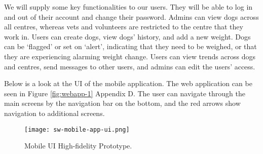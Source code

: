 We will supply some key functionalities to our users. They will be able to log in and out of their account and change their password. Admins can view dogs across all centres, whereas vets and volunteers are restricted to the centre that they work in. Users can create dogs, view dogs’ history, and add a new weight. Dogs can be ‘flagged’ or set on ‘alert’, indicating that they need to be weighed, or that they are experiencing alarming weight change. Users can view trends across dogs and centres, send messages to other users, and admins can edit the users’ access. 

Below is a look at the UI of the mobile application. The web application can be seen in Figure \ref{fig:webapp-1} Appendix D. The user can navigate through the main screens by the navigation bar on the bottom, and the red arrows show navigation to additional screens.
\begin{figure}[!ht]
	\centering
	\texttt{[image: sw-mobile-app-ui.png]}
	\caption{Mobile UI High-fidelity Prototype.}
	\label{fig:mobileapp-1}
\end{figure}

 

